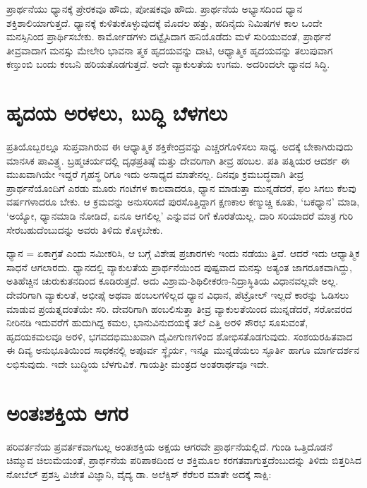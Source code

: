 ಪ್ರಾರ್ಥನೆಯು ಧ್ಯಾನಕ್ಕೆ ಪ್ರೇರಕವೂ ಹೌದು, ಪೋಷಕವೂ ಹೌದು. ಪ್ರಾರ್ಥನೆಯ ಅಭ್ಯಾಸದಿಂದ ಧ್ಯಾನ ಶಕ್ತಿಶಾಲಿಯಾಗುತ್ತದೆ. ಧ್ಯಾನಕ್ಕೆ ಕುಳಿತುಕೊಳ್ಳುವುದಕ್ಕೆ ಮೊದಲ ಹತ್ತು, ಹದಿನೈದು ನಿಮಿಷಗಳ ಕಾಲ ಒಂದೇ ಮನಸ್ಸಿನಿಂದ ಪ್ರಾರ್ಥಿಸಬೇಕು. ಕಾರ್ಮೋಡಗಳು ದಟ್ಟೈಸಿದಾಗ ಹನಿಯೊಡೆದು ಮಳೆ ಸುರಿಯುವಂತೆ, ಪ್ರಾರ್ಥನೆ ತೀವ್ರವಾದಾಗ ಮನಸ್ಸು ಮೇಲೇರಿ ಭಾವನಾ ತ್ಮಕ ಹೃದಯವನ್ನು ದಾಟಿ, ಆಧ್ಯಾತ್ಮಿಕ ಹೃದಯವನ್ನು ತಲುಪುವಾಗ ಕಣ್ತುಂಬಿ ಬಂದು ಕಂಬನಿ ಹರಿಯತೊಡಗುತ್ತದೆ. ಅದೇ ವ್ಯಾಕುಲತೆಯ ಉಗಮ. ಅದರಿಂದಲೇ ಧ್ಯಾನದ ಸಿದ್ಧಿ.


\section{ಹೃದಯ ಅರಳಲು, ಬುದ್ಧಿ ಬೆಳಗಲು}

ಪ್ರತಿಯೊಬ್ಬರಲ್ಲೂ ಸುಪ್ತವಾಗಿರುವ ಈ ಆಧ್ಯಾತ್ಮಿಕ ಶಕ್ತಿಕೇಂದ್ರವನ್ನು ಎಚ್ಚರಗೊಳಿಸಲು ಸಾಧ್ಯ. ಅದಕ್ಕೆ ಬೇಕಾಗಿರುವುದು ಮಾನಸಿಕ ಪಾವಿತ್ರ್ಯ. ಬ್ರಹ್ಮಚರ್ಯದಲ್ಲಿ ದೃಢಪ್ರತಿಷ್ಠೆ ಮತ್ತು ದೇವರಿಗಾಗಿ ತೀವ್ರ ಹಂಬಲ. ಪತಿ ಪತ್ನಿಯರ ಆದರ್ಶ ಈ ಮುಖವಾಗಿಯೇ ಇದ್ದರೆ ಗೃಹಸ್ಥ ರಿಗೂ ಇದು ಅಸಾಧ್ಯದ ಮಾತೇನಲ್ಲ. ದಿನವೂ ಕ್ರಮಬದ್ಧವಾಗಿ ತೀವ್ರ ಪ್ರಾರ್ಥನೆಯೊಂದಿಗೆ ಎರಡು ಮೂರು ಗಂಟೆಗಳ ಕಾಲವಾದರೂ, ಧ್ಯಾನ ಮಾಡುತ್ತಾ ಮುನ್ನಡೆದರೆ, ಫಲ ಸಿಗಲು ಕೆಲವು ವರ್ಷಗಳಾದರೂ ಬೇಕು. ಆ ಕ್ರಮವನ್ನು ಅನುಸರಿಸದೆ ಪುರಸೊತ್ತಿದ್ದಾಗ ಕ್ಷಣಕಾಲ ಕಣ್ಮುಚ್ಚಿ ಕೂತು, ‘ಬಕಧ್ಯಾನ’ ಮಾಡಿ, ‘ಅಯ್ಯೋ, ಧ್ಯಾನಮಾಡಿ ನೋಡಿದೆ, ಏನೂ ಆಗಲಿಲ್ಲ’ ಎನ್ನುವವ ರಿಗೆ ಕೊರತೆಯಿಲ್ಲ. ದಾರಿ ಸರಿಯಾದರೆ ಮಾತ್ರ ಗುರಿ ಸೇರಬಹುದೆಂಬುದನ್ನು ಅವರು ತಿಳಿದು ಕೊಳ್ಳಬೇಕು.

ಧ್ಯಾನ = ಏಕಾಗ್ರತೆ ಎಂದು ಸಮೀಕರಿಸಿ, ಆ ಬಗ್ಗೆ ವಿಶೇಷ ಪ್ರಚಾರಗಳು ಇಂದು ನಡೆಯು ತ್ತಿವೆ. ಆದರೆ ಇದು ಆಧ್ಯಾತ್ಮಿಕ ಸಾಧನೆ ಆಗಲಾರದು. ಧ್ಯಾನದಲ್ಲಿ ವ್ಯಾಕುಲತೆಯ ಪ್ರಾರ್ಥನೆಯಿಂದ ಪುಷ್ಟವಾದ ಮನಸ್ಸು ಅತ್ಯಂತ ಜಾಗರೂಕವಾಗಿದ್ದು, ಅತಿಹೆಚ್ಚಿನ ಚುರುಕುತನದಿಂದ ಕೂಡಿರುತ್ತದೆ. ಅದು ವಿಶ್ರಾಮ-ಶಿಥಿಲೀಕರಣ-ನಿದ್ರಾಸ್ಥಿತಿಯ ವಿಧಾನವಲ್ಲವೇ ಅಲ್ಲ. ದೇವರಿಗಾಗಿ ವ್ಯಾಕುಲತೆ, ಅಭೀಪ್ಸೆ ಅಥವಾ ಹಂಬಲಗಳಿಲ್ಲದ ಧ್ಯಾನ ವಿಧಾನ, ಪೆಟ್ರೋಲ್ ಇಲ್ಲದೆ ಕಾರನ್ನು ಓಡಿಸಲು ಮಾಡುವ ಪ್ರಯತ್ನದಂತೆಯೇ ಸರಿ. ದೇವರಿಗಾಗಿ ಹಂಬಲಿಸುತ್ತಾ ತೀವ್ರ ವ್ಯಾಕುಲತೆಯಿಂದ ಮುನ್ನಡೆದರೆ, ಸರೋವರದ ನೀರಿನಡಿ ಇದುವರೆಗೆ ಹುದುಗಿದ್ದ ಕಮಲ, ಭಾನುವಿನುದಯಕ್ಕೆ ತಲೆ ಎತ್ತಿ ಅರಳಿ ಸೌರಭ ಸೂಸುವಂತೆ, ಹೃದಯಕಮಲವೂ ಅರಳಿ, ಭಗವದಭಿಮುಖವಾಗಿ ದೈವೀಗುಣಗಳಿಂದ ಶೋಭಿಸತೊಡಗುವುದು. ಸಂಶಯರಹಿತವಾದ ಈ ದಿವ್ಯ ಅನುಭೂತಿಯಿಂದ ಸಾಧಕನಲ್ಲಿ ಅಪೂರ್ವ ಸ್ಥೈರ್ಯ, ಇನ್ನೂ ಮುನ್ನಡೆಯಲು ಸ್ಫೂರ್ತಿ ಹಾಗೂ ಮಾರ್ಗದರ್ಶನ ಲಭಿಸುವುದು. ಇದೇ ಬುದ್ಧಿಯ ಬೆಳಗುವಿಕೆ. ಗಾಯತ್ರೀ ಮಂತ್ರದ ಅಂತರಾರ್ಥವೂ ಇದೇ.


\section{ಅಂತಃಶಕ್ತಿಯ ಆಗರ}

ಪರಿವರ್ತನೆಯ ಪ್ರವರ್ತಕವಾಗಬಲ್ಲ ಅಂತಃಶಕ್ತಿಯ ಅಕ್ಷಯ ಆಗರವೇ ಪ್ರಾರ್ಥನೆಯಲ್ಲಿದೆ. ಗುಂಡಿ ಒತ್ತಿದೊಡನೆ ಚಿಮ್ಮುವ ಚಿಲುಮೆಯಂತೆ, ಪ್ರಾರ್ಥನೆಯ ಪರಿಪಾಠದಿಂದ ಆ ಶಕ್ತಿಮೂಲ ಕರಗತವಾಗುತ್ತದೆಂಬುದನ್ನು ತಿಳಿದು ಬಿತ್ತರಿಸಿದ ನೋಬೆಲ್ ಪ್ರಶಸ್ತಿ ವಿಜೇತ ವಿಜ್ಞಾನಿ, ವೈದ್ಯ ಡಾ. ಅಲೆಕ್ಸಿಸ್ ಕೆರೆಲರ ಮಾತೇ ಅದಕ್ಕೆ ಸಾಕ್ಷಿ:

